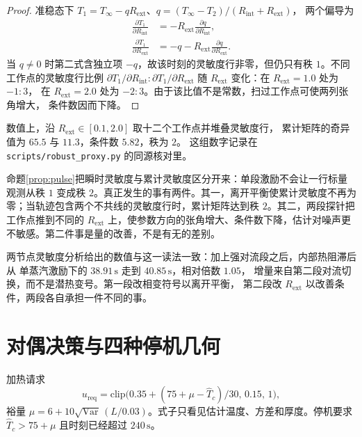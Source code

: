 \begin{proof}
准稳态下 \(T_1=T_\infty-qR_{\mathrm{ext}}\)、\(q=(T_\infty-T_2)/(R_{\mathrm{int}}+R_{\mathrm{ext}})\)，
两个偏导为
\begin{equation}
\begin{aligned}
\frac{\partial T_1}{\partial R_{\mathrm{int}}}&=-R_{\mathrm{ext}}\frac{\partial q}{\partial R_{\mathrm{int}}},\\
\frac{\partial T_1}{\partial R_{\mathrm{ext}}}&=-q-R_{\mathrm{ext}}\frac{\partial q}{\partial R_{\mathrm{ext}}}.
\end{aligned}
\end{equation}
当 \(q\neq0\) 时第二式含独立项 \(-q\)，故该时刻的灵敏度行非零，但仍只有秩 \(1\)。不同工作点的灵敏度行比例
\(\partial T_1/\partial R_{\mathrm{int}}:\partial T_1/\partial R_{\mathrm{ext}}\)
随 \(R_{\mathrm{ext}}\) 变化：在 \(R_{\mathrm{ext}}=1.0\) 处为 \(-1:3\)，
在 \(R_{\mathrm{ext}}=2.0\) 处为 \(-2:3\)。由于该比值不是常数，扫过工作点可使两列张角增大，
条件数因而下降。
\end{proof}

数值上，沿 \(R_{\mathrm{ext}}\in[0.1,2.0]\) 取十二个工作点并堆叠灵敏度行，
累计矩阵的奇异值为 \(65.5\) 与 \(11.3\)，条件数 \(5.82\)，秩为 \(2\)。
这组数字记录在 \texttt{scripts/robust\_proxy.py} 的同源核对里。

命题\ref{prop:pulse}把瞬时灵敏度与累计灵敏度区分开来：单段激励不会让一行标量观测从秩 \(1\) 变成秩 \(2\)。真正发生的事有两件。其一，离开平衡使累计灵敏度不再为零；当轨迹包含两个不共线的灵敏度行时，累计矩阵达到秩 \(2\)。其二，两段探针把工作点推到不同的 \(R_{\mathrm{ext}}\) 上，使参数方向的张角增大、条件数下降，估计对噪声更不敏感。第二件事是量的改善，不是有无的差别。

两节点灵敏度分析给出的数值与这一读法一致：加上强对流段之后，内部热阻滞后从
单蒸汽激励下的 \(38.91\,\mathrm{s}\) 走到 \(40.85\,\mathrm{s}\)，相对倍数 \(1.05\)，
增量来自第二段对流切换，而不是潜热变号。第一段改相变符号以离开平衡，
第二段改 \(R_{\mathrm{ext}}\) 以改善条件，两段各自承担一件不同的事。

\section{对偶决策与四种停机几何}

加热请求
\begin{equation}
\label{eq:ureq}
u_{\mathrm{req}}=\mathrm{clip}\big(0.35+(75+\mu-\hat T_c)/30,\,0.15,\,1\big),
\end{equation}
裕量 \(\mu=6+10\sqrt{\mathrm{Var}}\,(L/0.03)\)。式子只看见估计温度、方差和厚度。停机要求 \(\hat T_c>75+\mu\) 且时刻已经超过 \(240\,\mathrm{s}\)。

